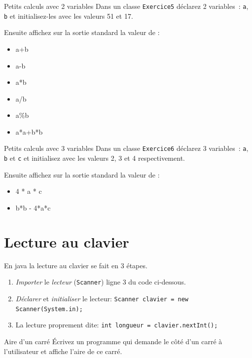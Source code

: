 \documentclass[a4paper,11pt]{article}
\begin{document}
	\begin{Exercice}{Petits calculs avec 2 variables} 		
		Dans un classe \texttt{Exercice5} déclarez 2 variables~: 
		\texttt{a}, \texttt{b} et initialisez-les avec les valeurs 51 et 17.
		
		Ensuite affichez sur la sortie standard la valeur de :
		\begin{itemize}
		 	\item a+b
			\item a-b
			\item a*b
			\item a/b
			\item a\%b
			\item a*a+b*b
		\end{itemize} 
	\end{Exercice}

	\begin{Exercice}{Petits calculs avec 3 variables} 
		Dans un classe \texttt{Exercice6} déclarez 3 variables~: 
		\texttt{a}, \texttt{b} et \texttt{c} et initialisez avec les valeurs 2, 3 et 4 respectivement.
		
		Ensuite affichez sur la sortie standard la valeur de :
		\begin{itemize}
		 	\item 4 * a * c
			\item b*b - 4*a*c
		\end{itemize} 
	\end{Exercice}

\section{Lecture au clavier}


	En java la lecture au clavier se fait en 3 étapes.

	\begin{enumerate}
		\item \emph{Importer} le \emph{lecteur} (\texttt{Scanner}) ligne 3 du code ci-dessous.
		\item \emph{Déclarer} et \emph{initialiser} le lecteur:  \texttt{Scanner clavier = new Scanner(System.in);}
		\item La lecture proprement dite: \texttt{int longueur = clavier.nextInt();}
	\end{enumerate}



	\begin{Exercice}{Aire d'un carré}
		\'Ecrivez un programme qui demande 
		le côté d'un carré à l'utilisateur et affiche l'aire de ce carré.
	\end{Exercice}
\end{document}
